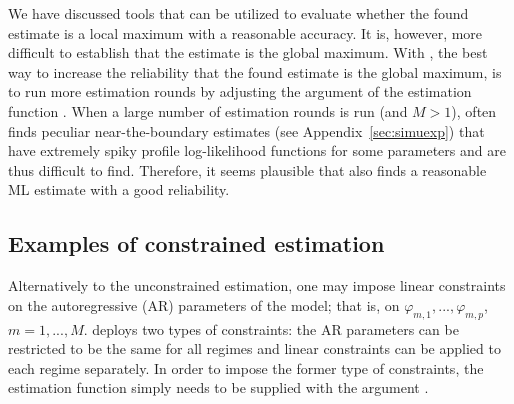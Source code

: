 \documentclass[nojss]{jss} %
\begin{document}
We have discussed tools that can be utilized to evaluate whether the found estimate is a local maximum with a reasonable accuracy. It is, however, more difficult to establish that the estimate is the global maximum. With , the best way to increase the reliability that the found estimate is the global maximum, is to run more estimation rounds by adjusting the argument  of the estimation function . When a large number of estimation rounds is run (and $M>1$),  often finds peculiar near-the-boundary estimates (see Appendix~\ref{sec:simuexp}) that have extremely spiky profile log-likelihood functions for some parameters and are thus difficult to find. Therefore, it seems plausible that  also finds a reasonable ML estimate with a good reliability.

\subsection{Examples of constrained estimation}\label{sec:examp_const}
Alternatively to the unconstrained estimation, one may impose linear constraints on the autoregressive (AR) parameters of the model; that is, on $\varphi_{m,1},...,\varphi_{m,p}$, $m=1,...,M$.  deploys two types of constraints: the AR parameters can be restricted to be the same for all regimes and linear constraints can be applied to each regime separately. In order to impose the former type of constraints, the estimation function simply needs to be supplied with the argument .
\end{document}
